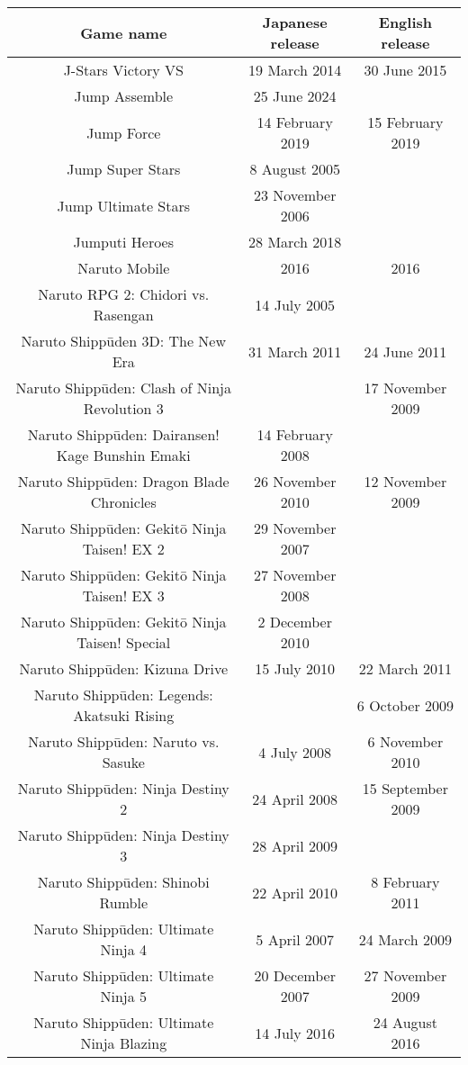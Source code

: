 \documentclass[a4paper,12pt]{article}
\begin{document}
\begin{tabular}{|c|c|c|} \hline
Game name & Japanese release & English release \\
 \hline
J-Stars Victory VS & 19 March 2014 & 30 June 2015 \\
Jump Assemble & 25 June 2024 &  \\
Jump Force & 14 February 2019 & 15 February 2019 \\
Jump Super Stars & 8 August 2005 &  \\
Jump Ultimate Stars & 23 November 2006 &  \\
Jumputi Heroes & 28 March 2018 &  \\
Naruto Mobile & 2016 & 2016 \\
Naruto RPG 2: Chidori vs. Rasengan & 14 July 2005 &  \\
Naruto Shippūden 3D: The New Era & 31 March 2011 & 24 June 2011 \\
Naruto Shippūden: Clash of Ninja Revolution 3 &  & 17 November 2009 \\
Naruto Shippūden: Dairansen! Kage Bunshin Emaki & 14 February 2008 &  \\
Naruto Shippūden: Dragon Blade Chronicles & 26 November 2010 & 12 November 2009 \\
Naruto Shippūden: Gekitō Ninja Taisen! EX 2 & 29 November 2007 &  \\
Naruto Shippūden: Gekitō Ninja Taisen! EX 3 & 27 November 2008 &  \\
Naruto Shippūden: Gekitō Ninja Taisen! Special & 2 December 2010 &  \\
Naruto Shippūden: Kizuna Drive & 15 July 2010 & 22 March 2011 \\
Naruto Shippūden: Legends: Akatsuki Rising &  & 6 October 2009 \\
Naruto Shippūden: Naruto vs. Sasuke & 4 July 2008 & 6 November 2010 \\
Naruto Shippūden: Ninja Destiny 2 & 24 April 2008 & 15 September 2009 \\
Naruto Shippūden: Ninja Destiny 3 & 28 April 2009 &  \\
Naruto Shippūden: Shinobi Rumble & 22 April 2010 & 8 February 2011 \\
Naruto Shippūden: Ultimate Ninja 4 & 5 April 2007 & 24 March 2009 \\
Naruto Shippūden: Ultimate Ninja 5 & 20 December 2007 & 27 November 2009 \\
Naruto Shippūden: Ultimate Ninja Blazing & 14 July 2016 & 24 August 2016 \\

\end{tabular}
\end{document}
